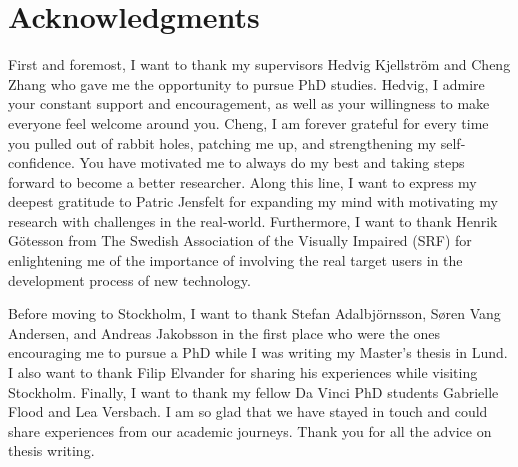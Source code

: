 
\chapter{Acknowledgments}
\label{chap:acknowledgements}

\noindent First and foremost, I want to thank my supervisors Hedvig Kjellström and Cheng Zhang who gave me the opportunity to pursue PhD studies. Hedvig, I admire your constant support and encouragement, as well as your willingness to make everyone feel welcome around you. Cheng, I am forever grateful for every time you pulled out of rabbit holes, patching me up, and strengthening my self-confidence. You have motivated me to always do my best and taking steps forward to become a better researcher. 
Along this line, I want to express my deepest gratitude to Patric Jensfelt for expanding my mind with motivating my research with challenges in the real-world. Furthermore, I want to thank Henrik Götesson from The Swedish Association of the Visually Impaired (SRF) for enlightening me of the importance of involving the real target users in the development process of new technology. 
\newline 


\noindent Before moving to Stockholm, I want to thank Stefan Adalbjörnsson, S{\o}ren Vang Andersen, and Andreas Jakobsson in the first place who were the ones encouraging me to pursue a PhD while I was writing my Master's thesis in Lund. I also want to thank Filip Elvander for sharing his experiences while visiting Stockholm. 
Finally, I want to thank my fellow Da Vinci PhD students Gabrielle Flood and Lea Versbach. I am so glad that we have stayed in touch and could share experiences from our academic journeys. Thank you for all the advice on thesis writing. 
\newline 

